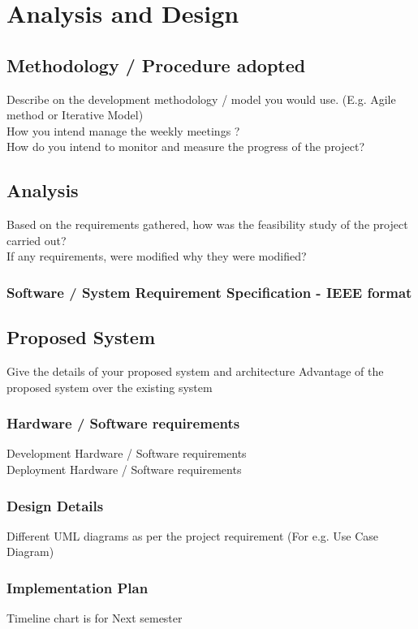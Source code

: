 \chapter{Analysis and Design}
\section{Methodology / Procedure adopted}

Describe on the development methodology / model you would use. (E.g. Agile method or Iterative Model) \\
How you intend manage the weekly meetings ? \\
How do you intend to monitor and measure the progress of the project? \\ 

\section{Analysis}

Based on the requirements gathered, how was the feasibility study of the project carried out? \\
If any requirements, were modified why they were modified? \\
\subsection{Software / System Requirement Specification - IEEE format}

\section{Proposed System}

Give the details of your proposed system and architecture 
Advantage of the proposed system over the existing system

\subsection{Hardware / Software requirements}
Development Hardware / Software requirements \\
Deployment Hardware / Software requirements \\

\subsection{Design Details}

Different UML diagrams as per the project requirement (For e.g. Use Case Diagram)

\subsection{Implementation Plan}

Timeline chart is for Next semester 



